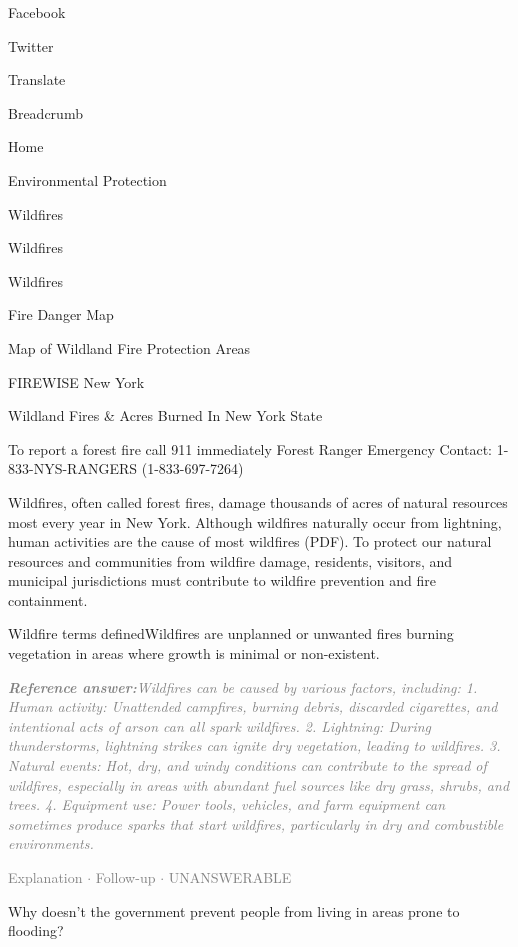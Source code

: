 \documentclass[a4paper,11pt]{article}
\begin{document}
\begin{docenv}
{Facebook

Twitter

Translate

Breadcrumb

Home

Environmental Protection

Wildfires

Wildfires

Wildfires

Fire Danger Map

Map of Wildland Fire Protection Areas

FIREWISE New York

Wildland Fires \& Acres Burned In New York State

To report a forest fire call 911 immediately
Forest Ranger Emergency Contact:
1-833-NYS-RANGERS (1-833-697-7264)

Wildfires, often called forest fires, damage thousands of acres of natural resources most every year in New York. Although wildfires naturally occur from lightning, human activities are the cause of most wildfires (PDF). To protect our natural resources and communities from wildfire damage, residents, visitors, and municipal jurisdictions must contribute to wildfire prevention and fire containment.

Wildfire terms definedWildfires are unplanned or unwanted fires burning vegetation in areas where growth is minimal or non-existent.}
\end{docenv}
\begin{refanswerenv}
{\footnotesize\textit{\textcolor{gray}{\textbf{Reference answer:}\enspace Wildfires can be caused by various factors, including:
1. Human activity: Unattended campfires, burning debris, discarded cigarettes, and intentional acts of arson can all spark wildfires.
2. Lightning: During thunderstorms, lightning strikes can ignite dry vegetation, leading to wildfires.
3. Natural events: Hot, dry, and windy conditions can contribute to the spread of wildfires, especially in areas with abundant fuel sources like dry grass, shrubs, and trees.
4. Equipment use: Power tools, vehicles, and farm equipment can sometimes produce sparks that start wildfires, particularly in dry and combustible environments.}}}
\end{refanswerenv}
\vspace{0.5em}
\hfill{\tiny\textcolor{gray}{Explanation $\cdot$ Follow-up $\cdot$ UNANSWERABLE}}
\begin{userbubble}
Why doesn't the government prevent people from living in areas prone to flooding?
\end{userbubble}
\end{document}
